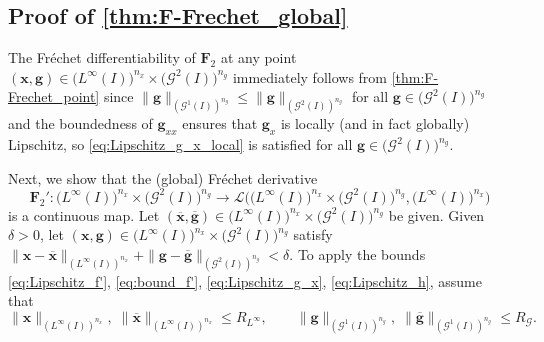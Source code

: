 \documentclass[onefignum,onetabnum]{siamart220329}
\numberwithin{equation}{section}
\newcommand{\bg}{\ensuremath{\mathbf{g}}} %
\newcommand{\bx}{\ensuremath{\mathbf{x}}} %
\newcommand{\BF}{\ensuremath{\mathbf{F}} } %
\newcommand {\cG} {\mathcal{G}}
\newcommand {\cL} {\mathcal{L}}
\begin{document}
\begin{appendix}
\subsection*{Proof of \cref{thm:F-Frechet_global}}
     The Fr\'echet differentiability of $\BF_2$ at any point $(\bx, \bg) \in \big(L^\infty(I)\big)^{n_x} \times \big(\cG^2(I)\big)^{n_g} $ immediately
     follows from \cref{thm:F-Frechet_point} since
    $ \| \bg \|_{(\cG^1(I))^{n_g}} \le  \| \bg \|_{(\cG^2(I))^{n_g} }$ for all $\bg \in \big(\cG^2(I)\big)^{n_g} $ and
     the boundedness of $\bg_{xx}$ ensures that $\bg_x$ is locally (and in fact globally) Lipschitz, 
     so \cref{eq:Lipschitz_g_x_local} is satisfied for all $\bg \in \big(\cG^2(I)\big)^{n_g}$.
     
     \sloppy
     Next, we show that the (global) Fr\'echet derivative 
     \[
          \BF_2' : \big(L^\infty(I)\big)^{n_x} \times \big(\cG^2(I)\big)^{n_g}  \rightarrow \cL\Big( \big(L^\infty(I)\big)^{n_x} \times \big(\cG^2(I)\big)^{n_g}, \big(L^\infty(I)\big)^{n_x} \Big)
     \]
      is a continuous map. 
     Let $(\overline{\bx}, \overline{\bg}) \in \big(L^\infty(I)\big)^{n_x} \times \big(\cG^2(I)\big)^{n_g} $ be given. 
     Given $\delta > 0$, let $(\bx, \bg) \in \big(L^\infty(I)\big)^{n_x} \times \big(\cG^2(I)\big)^{n_g} $ satisfy 
     $\| \bx - \overline{\bx} \|_{(L^\infty(I))^{n_x}}+ \| \bg - \overline{\bg} \|_{(\cG^2(I))^{n_g}} < \delta$.
     To apply the bounds  \cref{eq:Lipschitz_f'}, \cref{eq:bound_f'}, \cref{eq:Lipschitz_g_x}, \cref{eq:Lipschitz_h}, assume that
    \[
    	 \| \bx \|_{(L^\infty(I))^{n_x}}, \; \| \overline{\bx} \|_{(L^\infty(I))^{n_x}}\le  R_{L^\infty}, \qquad
	  \| \bg \|_{(\cG^1(I))^{n_g}}, \; \| \overline{\bg} \|_{(\cG^1(I))^{n_g}}  \le  R_\cG.
    \]
    

\end{appendix}
\end{document}
